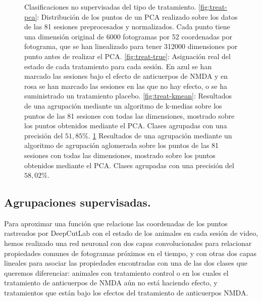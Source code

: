 \begin{figure}[p]
\begin{subfigure}{0.45\textwidth}
    \caption{}
    \label{fig:treat-agg}
  \end{subfigure}
  \caption[Clasificación no supervisada de tratamiento.]{Clasificaciones no supervisadas del tipo de tratamiento. \ref{fig:treat-pca}: Distribución de los puntos de un PCA realizado sobre los datos de las 81 sesiones preprocesados y normalizados. Cada punto tiene una dimensión original de 6000 fotogramas por 52 coordenadas por fotograma, que se han linealizado para tener 312000 dimensiones por punto antes de realizar el PCA. \ref{fig:treat-true}: Asignación real del estado de cada tratamiento para cada sesión. En azul se han marcado las sesiones bajo el efecto de anticuerpos de NMDA y en rosa se han marcado las sesiones en las que no hay efecto, o se ha suministrado un tratamiento placebo. \ref{fig:treat-kmean}: Resultados de una agrupación mediante un algoritmo de k-medias sobre los puntos de las 81 sesiones con todas las dimensiones, mostrado sobre los puntos obtenidos mediante el PCA. Clases agrupadas con una precisión del $ 51,85\% $. \ref{fig:treat-agg} Resultados de una agrupación mediante un algoritmo de agrupación aglomerada sobre los puntos de las 81 sesiones con todas las dimensiones, mostrado sobre los puntos obtenidos mediante el PCA. Clases agrupadas con una precisión del $ 58,02\% $.}
  \label{fig:unsupervied-treatment}
\end{figure}



\subsection{Agrupaciones supervisadas.}

Para aproximar una función que relacione las coordenadas de los puntos rastreados por DeepCutLab con el estado de los animales en cada sesión de video, hemos realizado una red neuronal con dos capas convolucionales para relacionar propiedades comunes de fotogramas próximos en el tiempo, y con otras dos capas lineales para asociar las propiedades encontradas con una de las dos clases que queremos diferenciar: animales con tratamiento control o en los cuales el tratamiento de anticuerpos de NMDA aún no está haciendo efecto, y tratamientos que están bajo los efectos del tratamiento de anticuerpos NMDA.

